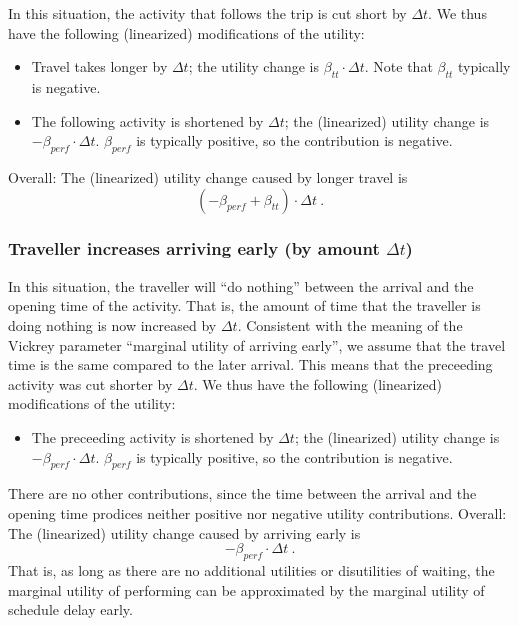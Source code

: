 In this situation, the activity that follows the trip is cut short by  $\Delta t$. We thus have the following (linearized) modifications  of the utility:
\begin{itemize}

\item Travel takes longer by $\Delta t$; the utility change is  $\beta_{tt} \cdot \Delta t$. Note that $\beta_{tt}$ typically is  negative.

\item The following activity is shortened by $\Delta t$; the (linearized)  utility change is $- \beta_{perf} \cdot \Delta t$.  $\beta_{perf}$ is  typically positive, so the contribution is negative.

\end{itemize}
Overall: The (linearized) utility change caused by longer travel is
\[
( - \beta_{perf} + \beta_{tt} ) \cdot \Delta t \ .
\]


\subsubsection{Traveller increases arriving early (by amount $\Delta t$)}

In this situation, the traveller will ``do nothing'' between the  arrival and the opening time of the activity. That is, the amount  of time that the traveller is doing nothing is now increased by  $\Delta t$. Consistent with the meaning of the Vickrey parameter  ``marginal utility of arriving early'', we assume that the travel time is  the same compared to the later arrival. This means that the preceeding  activity was cut shorter by $\Delta t$. We thus have the following  (linearized) modifications of the utility:
\begin{itemize}

\item The preceeding activity is shortened by $\Delta t$; the
(linearized) utility change is $- \beta_{perf} \cdot \Delta t$.
	$\beta_{perf}$ is typically positive, so the contribution is
	negative.

\end{itemize}
There are no other contributions, since the time between the  arrival and the opening time prodices neither positive nor negative  utility contributions. Overall: The (linearized) utility change  caused by arriving early is
\[
- \beta_{perf} \cdot \Delta t \ .
\]
That is, as long as there are no  additional utilities or disutilities of waiting, the marginal utility of  performing can be approximated by the marginal utility of schedule  delay early.

